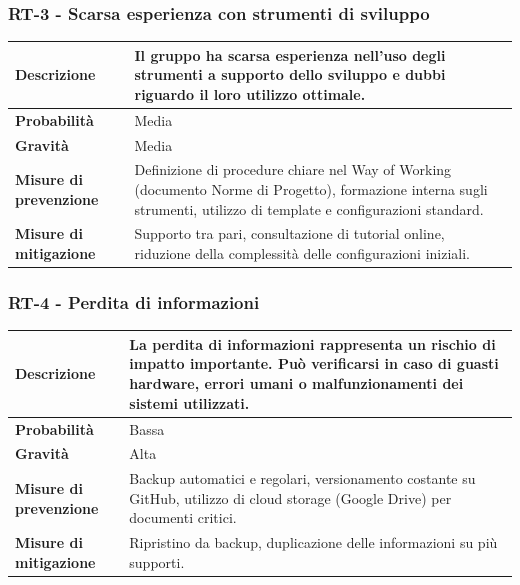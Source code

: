 \documentclass[11pt,a4paper]{article}
\begin{document}
\subsubsection{RT-3 - Scarsa esperienza con strumenti di sviluppo}
\begin{center}
\begin{tabular}{|p{3cm}|p{12cm}|}
    \hline
    \textbf{Descrizione} & Il gruppo ha scarsa esperienza nell'uso degli strumenti a supporto dello sviluppo e dubbi riguardo il loro utilizzo ottimale. \\
    \hline
    \textbf{Probabilità} & Media \\
    \hline
    \textbf{Gravità} & Media \\
    \hline
    \textbf{Misure di prevenzione} & Definizione di procedure chiare nel Way of Working (documento Norme di Progetto), formazione interna sugli strumenti, utilizzo di template e configurazioni standard. \\
    \hline
    \textbf{Misure di mitigazione} & Supporto tra pari, consultazione di tutorial online, riduzione della complessità delle configurazioni iniziali. \\
    \hline
\end{tabular}
\end{center}

\subsubsection{RT-4 - Perdita di informazioni}
\begin{center}
\begin{tabular}{|p{3cm}|p{12cm}|}
    \hline
    \textbf{Descrizione} & La perdita di informazioni rappresenta un rischio di impatto importante. Può verificarsi in caso di guasti hardware, errori umani o malfunzionamenti dei sistemi utilizzati. \\
    \hline
    \textbf{Probabilità} & Bassa \\
    \hline
    \textbf{Gravità} & Alta \\
    \hline
    \textbf{Misure di prevenzione} & Backup automatici e regolari, versionamento costante su GitHub, utilizzo di cloud storage (Google Drive) per documenti critici. \\
    \hline
    \textbf{Misure di mitigazione} & Ripristino da backup, duplicazione delle informazioni su più supporti. \\
    \hline
\end{tabular}
\end{center}
\end{document}
